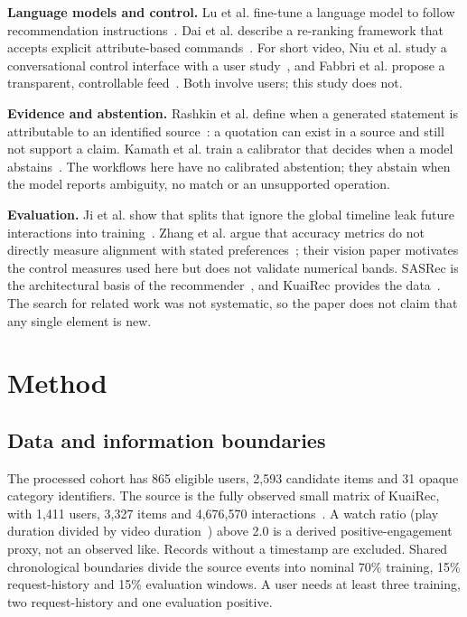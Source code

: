 \documentclass[conference]{IEEEtran}
\begin{document}
\textbf{Language models and control.} Lu et al. fine-tune a language model to follow recommendation instructions~\cite{lu2024aligning}. Dai et al. describe a re-ranking framework that accepts explicit attribute-based commands~\cite{dai2025token}. For short video, Niu et al. study a conversational control interface with a user study~\cite{niu2025chat}, and Fabbri et al. propose a transparent, controllable feed~\cite{fabbri2026feeding}. Both involve users; this study does not.

\textbf{Evidence and abstention.} Rashkin et al. define when a generated statement is attributable to an identified source~\cite{rashkin2023attribution}: a quotation can exist in a source and still not support a claim. Kamath et al. train a calibrator that decides when a model abstains~\cite{kamath2020selective}. The workflows here have no calibrated abstention; they abstain when the model reports ambiguity, no match or an unsupported operation.

\textbf{Evaluation.} Ji et al. show that splits that ignore the global timeline leak future interactions into training~\cite{ji2023leakage}. Zhang et al. argue that accuracy metrics do not directly measure alignment with stated preferences~\cite{zhang2026context}; their vision paper motivates the control measures used here but does not validate numerical bands. SASRec is the architectural basis of the recommender~\cite{kang2018sasrec}, and KuaiRec provides the data~\cite{gao2022kuairec}. The search for related work was not systematic, so the paper does not claim that any single element is new.

\section{Method}
\subsection{Data and information boundaries}
The processed cohort has 865 eligible users, 2,593 candidate items and 31 opaque category identifiers. The source is the fully observed small matrix of KuaiRec, with 1,411 users, 3,327 items and 4,676,570 interactions~\cite{gao2022kuairec}. A watch ratio (play duration divided by video duration~\cite{kuairecdocs}) above 2.0 is a derived positive-engagement proxy, not an observed like. Records without a timestamp are excluded. Shared chronological boundaries divide the source events into nominal 70\% training, 15\% request-history and 15\% evaluation windows. A user needs at least three training, two request-history and one evaluation positive.
\end{document}
